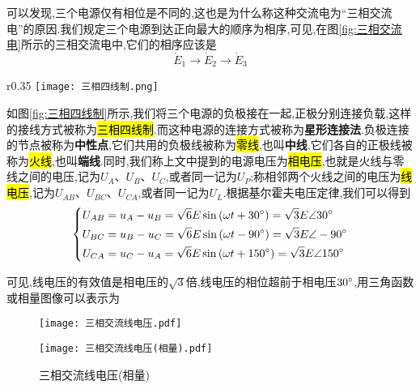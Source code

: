 \Par 可以发现,三个电源仅有相位是不同的,这也是为什么称这种交流电为“三相交流电”的原因.我们规定三个电源到达正向最大的顺序为相序,可见,在图\ref{fig:三相交流电}所示的三相交流电中,它们的相序应该是
\begin{equation*}
    \dot{E}_1\rightarrow \dot{E}_2\rightarrow \dot{E}_3
\end{equation*}

\begin{wrapfigure}[5]{r}{0.35\textwidth}
    \centering
    \texttt{[image: 三相四线制.png]}
    \caption{三相四线制}
    \label{fig:三相四线制}
\end{wrapfigure}
\Par 如图\ref{fig:三相四线制}所示,我们将三个电源的负极接在一起,正极分别连接负载,这样的接线方式被称为\hl{三相四线制}.而这种电源的连接方式被称为\textbf{星形连接法}.负极连接的节点被称为\textbf{中性点},它们共用的负极线被称为\hl{零线},也叫\textbf{中线},它们各自的正极线被称为\hl{火线},也叫\textbf{端线}.同时,我们称上文中提到的电源电压为\hl{相电压},也就是火线与零线之间的电压,记为$U_A$、$U_B$、$U_C$,或者同一记为$U_P$;称相邻两个火线之间的电压为\hl{线电压},记为$U_{AB}$、$U_{BC}$、$U_{CA}$,或者同一记为$U_L$.根据基尔霍夫电压定律,我们可以得到
\begin{equation}
    \left\{ \begin{aligned}
        U_{AB}&=u_A-u_B=\sqrt{6}E\sin \left( \omega t+30^{\circ } \right) =\sqrt{3}E\angle 30^{\circ }\\
        U_{BC}&=u_B-u_C=\sqrt{6}E\sin \left( \omega t-90^{\circ } \right) =\sqrt{3}E\angle -90^{\circ }\\
        U_{CA}&=u_C-u_A=\sqrt{6}E\sin \left( \omega t+150^{\circ } \right) =\sqrt{3}E\angle 150^{\circ }\\
    \end{aligned} \right.  
\end{equation}

可见,线电压的有效值是相电压的$\sqrt{3}$倍,线电压的相位超前于相电压$30^{\circ }$,用三角函数或相量图像可以表示为
\begin{figure}[htbp]
	\centering
	\begin{minipage}[b]{0.63\textwidth}
        \texttt{[image: 三相交流线电压.pdf]}
        	\caption{三相交流线电压}
        	\label{fig:三相交流线电压}
    \end{minipage}
    \begin{minipage}[b]{0.36\textwidth}
        \texttt{[image: 三相交流线电压(相量).pdf]}
        	\caption{三相交流线电压(相量)}
        	\label{fig:三相交流线电压(相量)}
    \end{minipage}
\end{figure}


